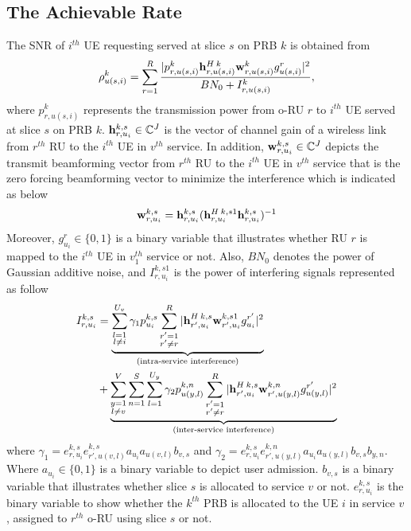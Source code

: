 \documentclass[conference]{IEEEtran}
\begin{document}
\subsection{The Achievable Rate}
The SNR of $i^{th}$ UE requesting served at slice $s$ on PRB $k$ is obtained from
\begin{equation}\label{eq2}
\rho_{u(s,i)}^{k} =  \sum_{r=1}^{R}\frac{|p_{r,u(s,i)}^{k}{\bold{h}_{r,u(s,i)}^{H \: k}} \bold{w}_{r,u(s,i)}^{k} g_{u(s,i)}^r|^2}{BN_0 + I_{r,u(s,i)}^{k}},
\end{equation} 
where $p_{r,u(s,i)}^{k}$ represents the transmission power from o-RU $r$ to $i^{th}$ UE served at slice $s$ on PRB $k$. 
${\bold{h}_{r,u_i}^{k,s}} \in \mathbb{C}^{J}$ is the vector of channel gain of a wireless link from 
$r^{th}$ RU to the $i^{th}$ UE in $v^{th}$ service. In addition, $\bold{w}_{r,u_i}^{k,s} \in \mathbb{C}^{J}$ depicts the  transmit beamforming vector from $r^{th}$ RU to the $i^{th}$ UE in $v^{th}$ service that is the zero forcing beamforming vector to minimize the interference which is indicated as below
\begin{equation}
\bold{w}_{r,u_i}^{k,s} = {\bold{h}_{r,u_i}^{k,s}}({\bold{h}_{r,u_i}^{H \: k,s1}} {\bold{h}_{r,u_i}^{k,s}})^{-1}
\end{equation}
Moreover, $g_{u_i}^r \in \{0,1\}$ is a binary variable that illustrates whether RU $r$ is mapped to the $i^{th}$ UE in $v_{1}^{th}$ service or not. 
Also, $BN_0$ denotes the power of Gaussian additive noise, and $I_{r,u_i}^{k,s1}$ is the power of interfering signals represented as follow
\begin{equation}
\begin{split}
I_{r,u_i}^{k,s} &=
 \underbrace{\sum_{\substack{l=1 \\ l\neq i}}^{{U}_{v}} \gamma_{1}  p_{u_i}^{k,s}\sum_{\substack{r'=1 \\ r'\neq r}}^{R}|{\bold{h}_{r',u_i}^{H \: k,s}} \bold{w}_{r',u_i}^{k,s1} g_{u_i}^{r'}|^2}_{\text{(intra-service interference)}}\\
&+ \underbrace{\sum_{\substack{y=1 \\ l\neq v}}^{V}\sum_{n=1}^{S}\sum_{l=1}^{{U}_y} \gamma_{2}  p_{u(y,l)}^{k,n}\sum_{\substack{r'=1 \\ r'\neq r}}^{R}|{\bold{h}_{r',u_i}^{H \: k,s}} \bold{w}_{r',u(y,l)}^{k,n} g_{u(y,l)}^{r'}|^2}_{\text{(inter-service interference)}}\\
\end{split}
\end{equation}
where $\gamma_{1} = e^{k,s}_{r,u_i}e^{k,s}_{r',u(v,l)}a_{u_i}a_{u(v,l)} b_{v, s} $
and $\gamma_{2} = e^{k,s}_{r,u_i}e^{k,n}_{r',u(y,l)}a_{u_i}a_{u(y,l)} b_{v, s} b_{y,n} $.
Where $a_{u_i} \in \{0,1\}$ is a binary variable to depict user admission.
$b_{v, s}$ is a binary variable that illustrates whether slice $s$ is allocated to service $v$ or not. 
$e^{k,s}_{r,u_i}$ is the binary variable to show whether the $k^{th}$ PRB is allocated to the UE $i$ in service $v$, assigned to $r^{th}$ o-RU using slice $s$ or not.
\end{document}
